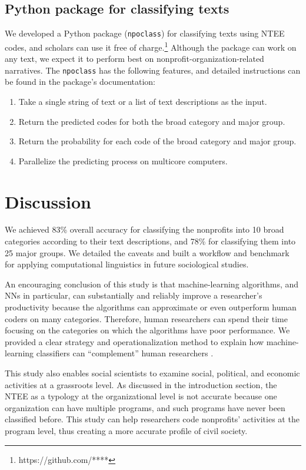\documentclass[11pt]{article}
\begin{document}
\subsection{Python package for classifying texts}

We developed a Python package (\texttt{npoclass}) for classifying texts using NTEE codes, and scholars can use it free of charge.\footnote{https://github.com/****} Although the package can work on any text, we expect it to perform best on nonprofit-organization-related narratives. The \texttt{npoclass} has the following features, and detailed instructions can be found in the package's documentation:

\begin{enumerate}[nosep]
	\item Take a single string of text or a list of text descriptions as the input.
	\item Return the predicted codes for both the broad category and major group.
	\item Return the probability for each code of the broad category and major group.
	\item Parallelize the predicting process on multicore computers.
\end{enumerate}


\section{Discussion}

We achieved 83\% overall accuracy for classifying the nonprofits into 10 broad categories according to their text descriptions, and 78\% for classifying them into 25 major groups. We detailed the caveats and built a workflow and benchmark for applying computational linguistics in future sociological studies. 

An encouraging conclusion of this study is that machine-learning algorithms, and NNs in particular, can substantially and reliably improve a researcher's productivity because the algorithms can approximate or even outperform human coders on many categories. Therefore, human researchers can spend their time focusing on the categories on which the algorithms have poor performance. We provided a clear strategy and operationalization method to explain how machine-learning classifiers can ``complement'' human researchers \parencite[25]{NelsonFutureCodingComparison2018}.

This study also enables social scientists to examine social, political, and economic activities at a grassroots level. As discussed in the introduction section, the NTEE as a typology at the organizational level is not accurate because one organization can have multiple programs, and such programs have never been classified before. This study can help researchers code nonprofits' activities at the program level, thus creating a more accurate profile of civil society.
\end{document}
